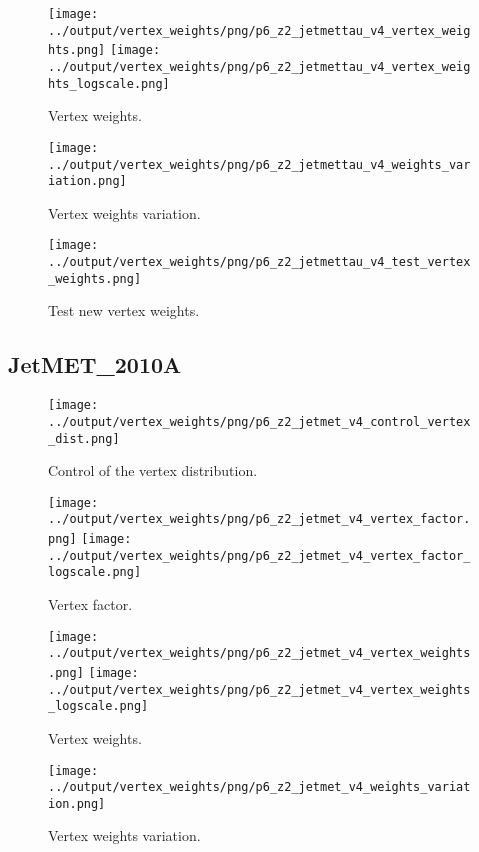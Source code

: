 \documentclass[11pt]{book}
\begin{document}
\begin{figure}[ht]
\centering
\texttt{[image: ../output/vertex\_weights/png/p6\_z2\_jetmettau\_v4\_vertex\_weights.png]}
\texttt{[image: ../output/vertex\_weights/png/p6\_z2\_jetmettau\_v4\_vertex\_weights\_logscale.png]}
\caption{Vertex weights.}
\end{figure}

\begin{figure}[ht]
\centering
\texttt{[image: ../output/vertex\_weights/png/p6\_z2\_jetmettau\_v4\_weights\_variation.png]}
\caption{Vertex weights variation.}
\end{figure}

\begin{figure}[ht]
\centering
\texttt{[image: ../output/vertex\_weights/png/p6\_z2\_jetmettau\_v4\_test\_vertex\_weights.png]}
\caption{Test new vertex weights.}
\end{figure}
\clearpage

\subsection{JetMET\_2010A}
\begin{figure}[ht]
\centering
\texttt{[image: ../output/vertex\_weights/png/p6\_z2\_jetmet\_v4\_control\_vertex\_dist.png]}
\caption{Control of the vertex distribution.}
\end{figure}

\begin{figure}[ht]
\centering
\texttt{[image: ../output/vertex\_weights/png/p6\_z2\_jetmet\_v4\_vertex\_factor.png]}
\texttt{[image: ../output/vertex\_weights/png/p6\_z2\_jetmet\_v4\_vertex\_factor\_logscale.png]}
\caption{Vertex factor.}
\end{figure}

\begin{figure}[ht]
\centering
\texttt{[image: ../output/vertex\_weights/png/p6\_z2\_jetmet\_v4\_vertex\_weights.png]}
\texttt{[image: ../output/vertex\_weights/png/p6\_z2\_jetmet\_v4\_vertex\_weights\_logscale.png]}
\caption{Vertex weights.}
\end{figure}

\begin{figure}[ht]
\centering
\texttt{[image: ../output/vertex\_weights/png/p6\_z2\_jetmet\_v4\_weights\_variation.png]}
\caption{Vertex weights variation.}
\end{figure}
\end{document}
